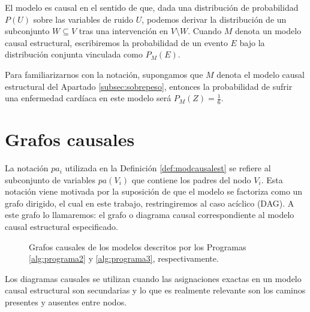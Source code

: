 \documentclass[oneside,openright,titlepage,numbers=noenddot,openany,headinclude,footinclude=true,
cleardoublepage=empty,abstractoff,BCOR=5mm,paper=a4,fontsize=12pt,main=spanish]{scrreprt}
\begin{document}
El modelo es causal en el sentido de que, dada una distribución de probabilidad $P(U)$ sobre las variables de ruido $U$, podemos derivar la distribución de un subconjunto $W \subseteq V$ tras una intervención en $V \setminus W$. Cuando $M$ denota un modelo causal estructural, escribiremos la probabilidad de un evento $E$ bajo la distribución conjunta vinculada como $P_M(E)$. 

Para familiarizarnos con la notación, supongamos que $M$ denota el modelo causal estructural del Apartado \ref{subsec:sobrepeso}, entonces la probabilidad de sufrir una enfermedad cardíaca en este modelo será $P_M(Z) = \frac{1}{6}$.

\section{Grafos causales}

La notación $pa_i$ utilizada en la Definición \ref{def:modcausalest} se refiere al subconjunto de variables $pa(V_i)$ que contiene los padres del nodo $V_i$. Esta notación viene motivada por la suposición de que el modelo se factoriza como un grafo dirigido, el cual en este trabajo, restringiremos al caso acíclico (DAG). A este grafo lo llamaremos: el grafo o diagrama causal correspondiente al modelo causal estructural especificado.\\

\begin{figure}[h]
\centering
{}
\caption{Grafos causales de los modelos descritos por los Programas \ref{alg:programa2} y \ref{alg:programa3}, respectivamente.}
\end{figure}

Los diagramas causales se utilizan cuando las asignaciones exactas en un modelo causal estructural son secundarias y lo que es realmente relevante son los caminos presentes y ausentes entre nodos. 
\end{document}
